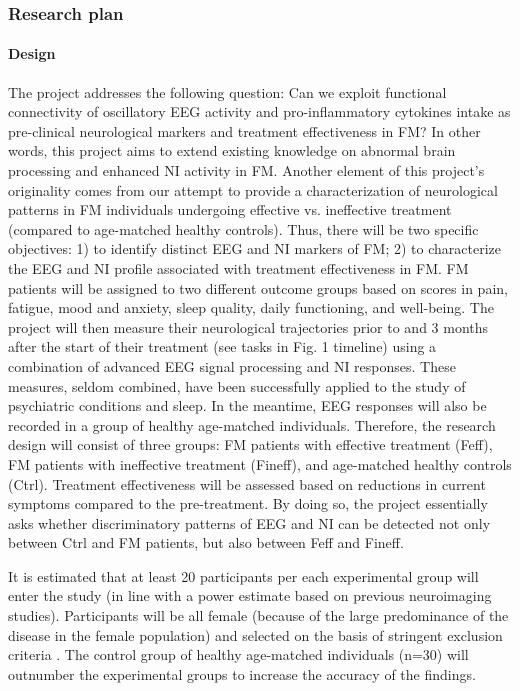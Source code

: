 \documentclass[twocolumn, serif, rga, numeric]{jote-article}
\begin{document}
\subsubsection*{Research plan}


\noindent\paragraph{\noindent Design}


The project addresses the following question: Can we exploit functional
connectivity of oscillatory EEG activity and pro-inflammatory cytokines
intake as pre-clinical neurological markers and treatment effectiveness
in FM? In other words, this project aims to extend existing knowledge on
abnormal brain processing and enhanced NI activity in FM. Another
element of this project's originality comes from our attempt to provide
a characterization of neurological patterns in FM individuals undergoing
effective vs. ineffective treatment (compared to age-matched healthy
controls). Thus, there will be two specific objectives: 1) to identify
distinct EEG and NI markers of FM; 2) to characterize the EEG and NI
profile associated with treatment effectiveness in FM. FM patients will
be assigned to two different outcome groups based on scores in pain,
fatigue, mood and anxiety, sleep quality, daily functioning, and
well-being. The project will then measure their neurological
trajectories prior to and 3 months after the start of their treatment
(see tasks in Fig. 1 timeline) using a combination of advanced EEG
signal processing and NI responses. These measures, seldom combined,
have been successfully applied to the study of psychiatric conditions
and sleep. In the meantime, EEG responses will also be recorded in a
group of healthy age-matched individuals. Therefore, the research design
will consist of three groups: FM patients with effective treatment
(Feff), FM patients with ineffective treatment (Fineff), and age-matched
healthy controls (Ctrl). Treatment effectiveness will be assessed based
on reductions in current symptoms compared to the pre-treatment. By
doing so, the project essentially asks whether discriminatory patterns
of EEG and NI can be detected not only between Ctrl and FM patients, but
also between Feff and Fineff.

It is estimated that at least 20 participants per each experimental
group will enter the study (in line with a power estimate based on
previous neuroimaging studies). Participants will be all female (because
of the large predominance of the disease in the female population) and
selected on the basis of stringent exclusion
criteria \cite{Napadow2010}. The control group of healthy age-matched
individuals (n=30) will outnumber the experimental groups to increase
the accuracy of the findings.
\end{document}
